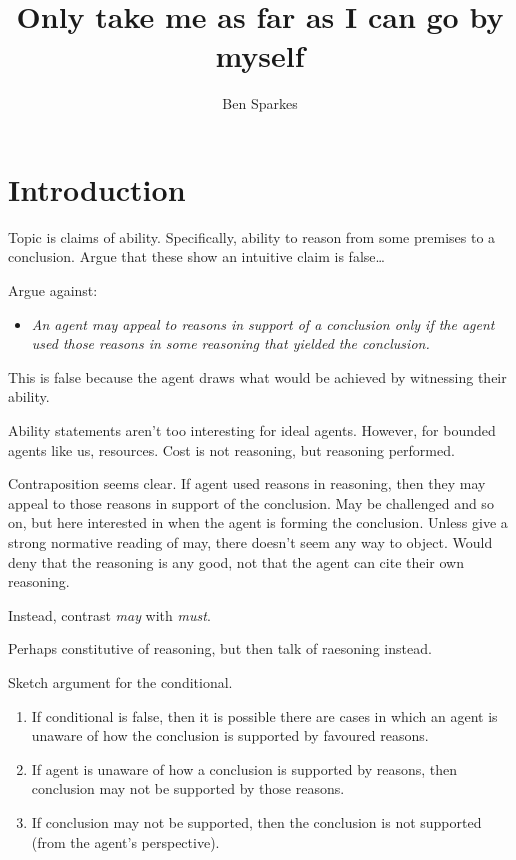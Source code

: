 \documentclass[10pt]{article}
\title{Only take me as far as I can go by myself}
\author{Ben Sparkes}
\begin{document}
\tableofcontents









\newpage

\maketitle

\section{Introduction}
\label{sec:introduction-1}


{
  \color{red}
  Topic is claims of ability.
  Specifically, ability to reason from some premises to a conclusion.
  Argue that these show an intuitive claim is false\dots
}

Argue against:
\begin{itemize}
\item\label{denied-claim} \emph{An agent may appeal to reasons in support of a conclusion only if the agent used those reasons in some reasoning that yielded the conclusion.}
\end{itemize}

{
  \color{red}
  This is false because the agent draws what would be achieved by witnessing their ability.
}

{
  \color{red}
  Ability statements aren't too interesting for ideal agents.
  However, for bounded agents like us, resources.
  Cost is not reasoning, but reasoning performed.
}

Contraposition seems clear.
If agent used reasons in reasoning, then they may appeal to those reasons in support of the conclusion.
May be challenged and so on, but here interested in when the agent is forming the conclusion.
Unless give a strong normative reading of may, there doesn't seem any way to object.
Would deny that the reasoning is any good, not that the agent can cite their own reasoning.

Instead, contrast \emph{may} with \emph{must}.

Perhaps constitutive of reasoning, but then talk of raesoning instead.

Sketch argument for the conditional.

\begin{enumerate}
\item\label{opp:sketch:1} If conditional is false, then it is possible there are cases in which an agent is unaware of how the conclusion is supported by favoured reasons.
\item\label{opp:sketch:2} If agent is unaware of how a conclusion is supported by reasons, then conclusion may not be supported by those reasons.
\item\label{opp:sketch:3} If conclusion may not be supported, then the conclusion is not supported (from the agent's perspective).
\end{enumerate}
\end{document}
